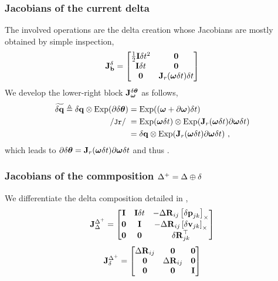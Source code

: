 \subsubsection{Jacobians of the current delta}
\label{sec:jac_data}

The involved operations are the delta creation  whose Jacobians are mostly obtained by simple inspection,
%
\begin{align}\label{equ:jacobian_current_delta}
{{\bf J}^{\delta}_{{\bf b}}} =
\begin{bmatrix}
\frac12{\bf I}\delta t^2 	& \bf0 \\
{\bf I}\delta t 			& \bf0 \\
\bf0 				& {\bf J}_r({{\bm \omega}}\delta t)\delta t
\end{bmatrix}
\end{align}
%
We develop the lower-right block ${\bf J}^{\delta{{\bm \theta}}}_{{\bm \omega}}$ as follows,
%
\begin{align*}
\widetilde\dq \te \dq\ot\Exp(\partial\dth) 
&= \Exp((\bw+\partial\bw)\dt) \\
\cJr &= \Exp(\bw\dt)\ot\Exp(\bfJ_r(\bw\dt)\partial\bw\dt) \\
&= \dq \ot \Exp(\bfJ_r(\bw\dt)\partial\bw\dt)
~,
\end{align*}
%
which leads to 
$\partial{\delta{{\bm \theta}}} = {\bf J}_r({{\bm \omega}}\delta t)\partial{{\bm \omega}}\delta t$ 
and thus .



\subsubsection{Jacobians of the commposition $\Delta^+=\Delta\oplus\delta$}

We differentiate the delta composition  detailed in ,
%
\begin{align}
{{\bf J}^{\Delta^+}_{\Delta}} = \begin{bmatrix}
{\bf I}  & {\bf I}\delta t & - {\Delta{\bf R}}_{ij}  \left[{\delta{\bf p}}_{jk}\right]_\times  \\
\bf0  & {\bf I}    & - {\Delta{\bf R}}_{ij}  \left[{\delta{\bf v}}_{jk}\right]_\times \\
\bf0  & \bf0    &   {\delta{\bf R}}_{jk}^{\top} 
\end{bmatrix}
\end{align}
%
\begin{align}
{{\bf J}^{\Delta^+}_{\delta}} = \begin{bmatrix}
{\Delta{\bf R}}_{ij} & \bf0     & \bf0 \\
\bf0     & {\Delta{\bf R}}_{ij} & \bf0 \\
\bf0     & \bf0     & {\bf I}  
\end{bmatrix}
\end{align}



